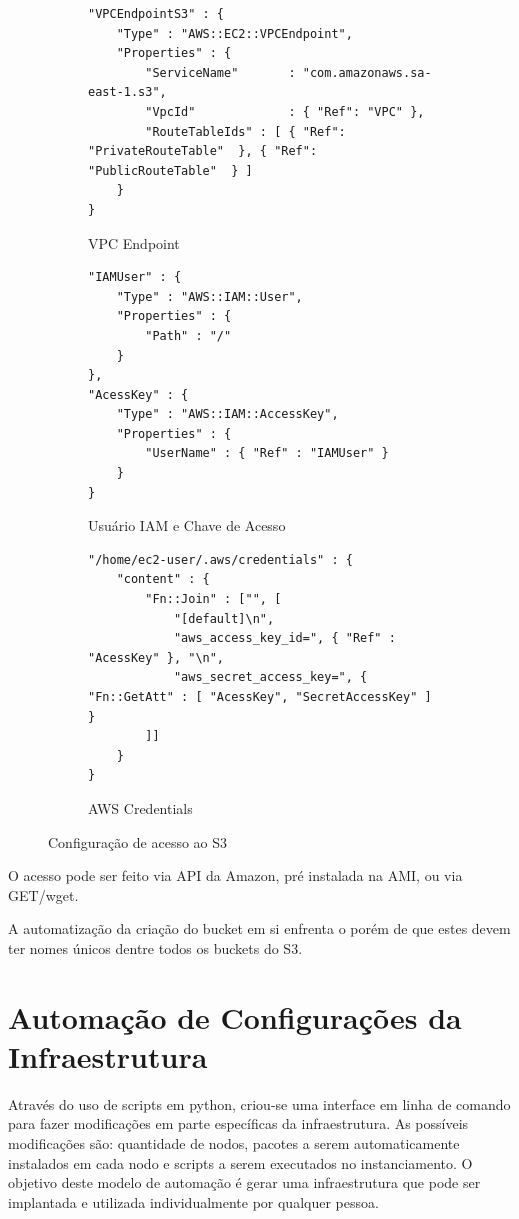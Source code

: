 \documentclass[tg]{mdtufsm}
\begin{document}
\begin{figure}
\centering

\begin{subfigure}[c]{1\textwidth}
\begin{lstlisting}[frame=single, numbers=none]
"VPCEndpointS3" : {
	"Type" : "AWS::EC2::VPCEndpoint",
	"Properties" : {
		"ServiceName"		: "com.amazonaws.sa-east-1.s3",
		"VpcId"				: { "Ref": "VPC" },
		"RouteTableIds"	: [ { "Ref": "PrivateRouteTable"  }, { "Ref": "PublicRouteTable"  } ]
	}
}
\end{lstlisting}
\caption{VPC Endpoint}
\label{vpcEndpoint}
\end{subfigure}

\begin{subfigure}[c]{1\textwidth}
\begin{lstlisting}[frame=single, numbers=none]
"IAMUser" : {
	"Type" : "AWS::IAM::User",
	"Properties" : {
		"Path" : "/"
	}
},		
"AcessKey" : {
	"Type" : "AWS::IAM::AccessKey",
	"Properties" : {
		"UserName" : { "Ref" : "IAMUser" }
	}
} 
\end{lstlisting}
\caption{Usuário IAM e Chave de Acesso}
\label{accessKey}
\end{subfigure}

\begin{subfigure}[c]{1\textwidth}
\begin{lstlisting}[frame=single, numbers=none]
"/home/ec2-user/.aws/credentials" : {
	"content" : {
		"Fn::Join" : ["", [
			"[default]\n",
			"aws_access_key_id=", { "Ref" : "AcessKey" }, "\n",
			"aws_secret_access_key=", { "Fn::GetAtt" : [ "AcessKey", "SecretAccessKey" ] }					
		]]
	}
}
\end{lstlisting}
\caption{AWS Credentials}
\label{awsCredentials}
\end{subfigure}
\caption{Configuração de acesso ao S3}
\end{figure}

O acesso pode ser feito via API da Amazon, pré instalada na AMI, ou via GET/wget.

A automatização da criação do bucket em si enfrenta o porém de que estes devem ter nomes únicos dentre todos os buckets do S3.


\section{Automação de Configurações da Infraestrutura}

Através do uso de scripts em python, criou-se uma interface em linha de comando para fazer modificações em parte específicas da infraestrutura. As possíveis modificações são: quantidade de nodos, pacotes a serem automaticamente instalados em cada nodo e scripts a serem executados no instanciamento. O objetivo deste modelo de automação é gerar uma infraestrutura que pode ser implantada e utilizada individualmente por qualquer pessoa.
\end{document}
